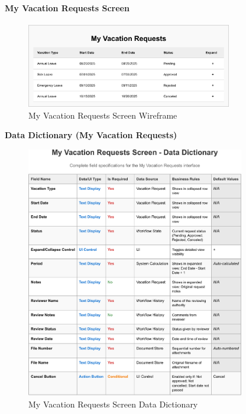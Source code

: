 \documentclass[12pt,a4paper]{article}
\begin{document}
\paragraph{My Vacation Requests Screen}
\begin{figure}[H]
\centering
\includegraphics[width=0.8\textwidth]{Wireframes/My-Vacation-Requests/My-Vacation-Requests-1.png}
\caption{My Vacation Requests Screen Wireframe}
\label{fig:wireframe-my-vacation-requests}
\end{figure}

\noindent\textbf{Data Dictionary (My Vacation Requests)}
\begin{figure}[H]
\centering
\includegraphics[width=0.85\textwidth]{Data-Dictionary/Screen-Data-Dictionaries/My-Vacation-Requests-Screen-Data-Dictionary/My-Vacation-Requests-Screen-Data-Dictionary-1.png}
\caption{My Vacation Requests Screen Data Dictionary}
\label{fig:my-vacation-requests-data-dict-inline}
\end{figure}
\end{document}
